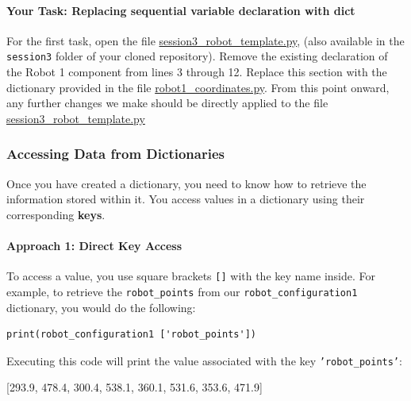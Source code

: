 \paragraph{Your Task: Replacing sequential variable declaration with dict}

For the first task, open the file \href{https://github.com/balandongiv/computer_programming_gist/blob/main/session3/session3_robot_template.py}{session3\_robot\_template.py}, (also available in the \texttt{session3} folder of your cloned repository). Remove the existing declaration of the Robot 1 component from lines 3 through 12. Replace this section with the dictionary provided in the file \href{https://github.com/balandongiv/computer_programming_gist/blob/main/session3/robot1_coordinates.py}{robot1\_coordinates.py}.
From this point onward, any further changes we make should be directly applied to the file \href{https://github.com/balandongiv/computer_programming_gist/blob/main/session3/session3_robot_template.py}{session3\_robot\_template.py}


\subsubsection{Accessing Data from Dictionaries}

Once you have created a dictionary, you need to know how to retrieve the information stored within it. You access values in a dictionary using their corresponding \textbf{keys}.

\paragraph*{Approach 1: Direct Key Access}

To access a value, you use square brackets \texttt{[]} with the key name inside. For example, to retrieve the \texttt{robot\_points} from our \texttt{robot\_configuration1} dictionary, you would do the following:

\begin{verbatim}
print(robot_configuration1 ['robot_points'])
\end{verbatim}
\noindent
Executing this code will print the value associated with the key \texttt{'robot\_points'}:

 \begin{sloppypar}
[293.9, 478.4, 300.4, 538.1, 360.1, 531.6, 353.6, 471.9]
\end{sloppypar}



